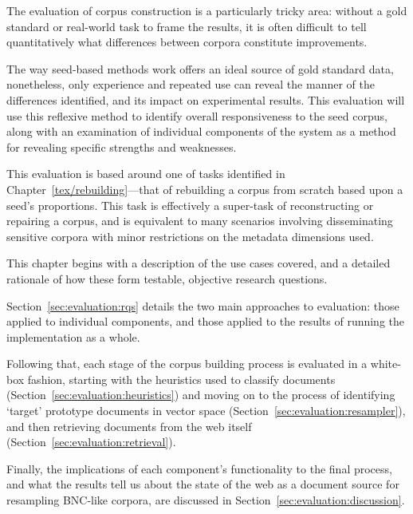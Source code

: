 
The evaluation of corpus construction is a particularly tricky area: without a gold standard or real-world task to frame the results, it is often difficult to tell quantitatively what differences between corpora constitute improvements.


The way seed-based methods work offers an ideal source of gold standard data, nonetheless, only experience and repeated use can reveal the manner of the differences identified, and its impact on experimental results.  This evaluation will use this reflexive method to identify overall responsiveness to the seed corpus, along with an examination of individual components of the system as a method for revealing specific strengths and weaknesses.

This evaluation is based around one of tasks identified in Chapter~\ref{tex/rebuilding}---that of rebuilding a corpus from scratch based upon a seed's proportions.  This task is effectively a super-task of reconstructing or repairing a corpus, and is equivalent to many scenarios involving disseminating sensitive corpora with minor restrictions on the metadata dimensions used.



This chapter begins with a description of the use cases covered, and a detailed rationale of how these form testable, objective research questions.

Section~\ref{sec:evaluation:rqs} details the two main approaches to evaluation: those applied to individual components, and those applied to the results of running the implementation as a whole.

Following that, each stage of the corpus building process is evaluated in a white-box fashion, starting with the heuristics used to classify documents (Section~\ref{sec:evaluation:heuristics}) and moving on to the process of identifying `target' prototype documents in vector space (Section~\ref{sec:evaluation:resampler}), and then retrieving documents from the web itself (Section~\ref{sec:evaluation:retrieval}).

Finally, the implications of each component's functionality to the final process, and what the results tell us about the state of the web as a document source for resampling BNC-like corpora, are discussed in Section~\ref{sec:evaluation:discussion}.




